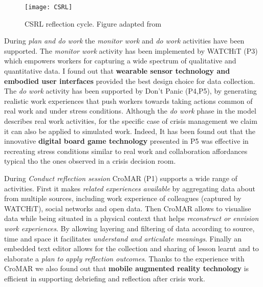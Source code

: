 \begin{figure}[tbh]
    \centering
    \texttt{[image: CSRL]}
    \caption{CSRL reflection cycle. Figure adapted from \protect\autocite{Krogstie:2013kf}}
    \label{fig:csrl-model-contrib}
\end{figure}

During \emph{plan and do work} the \emph{monitor work} and \emph{do
work} activities have been supported. The \emph{monitor work} activity
has been implemented by WATCHiT (P3) which empowers workers for
capturing a wide spectrum of qualitative and quantitative data. I found
out that \textbf{wearable sensor technology and embodied user
interfaces} provided the best design choice for data collection. The
\emph{do work} activity has been supported by Don't Panic (P4,P5), by
generating realistic work experiences that push workers towards taking
actions common of real work and under stress conditions. Although the
\emph{do work} phase in the model describes real work activities, for
the specific case of crisis management we claim it can also be applied
to simulated work. Indeed, It has been found out that the innovative
\textbf{digital board game technology} presented in P5 was effective in
recreating stress conditions similar to real work and collaboration
affordances typical tho the ones observed in a crisis decision room.

During \emph{Conduct reflection session} CroMAR (P1) supports a wide
range of activities. First it makes \emph{related experiences available}
by aggregating data about from multiple sources, including work
experience of colleagues (captured by WATCHiT), social networks and open
data. Then CroMAR allows to visualise data while being situated in a
physical context that helps \emph{reconstruct or envision work
experiences}. By allowing layering and filtering of data according to
source, time and space it facilitates \emph{understand and articulate
meanings}. Finally an embedded text editor allows for the collection and
sharing of lesson learnt and to elaborate a \emph{plan to apply
reflection outcomes}. Thanks to the experience with CroMAR we also found
out that \textbf{mobile augmented reality technology} is efficient in
supporting debriefing and reflection after crisis work.

